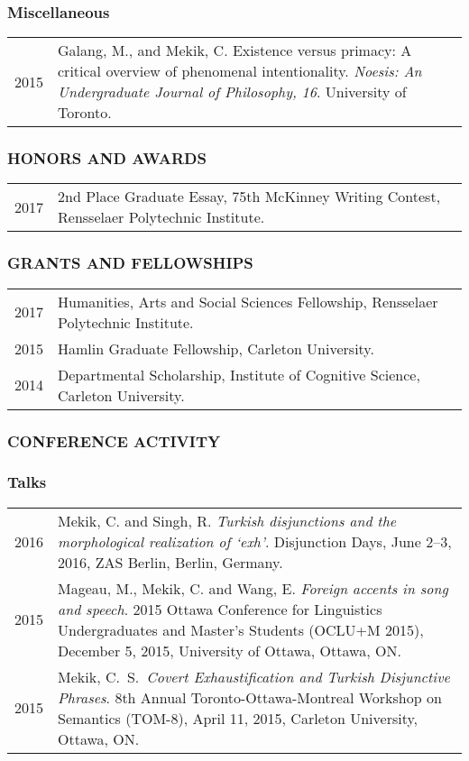 \documentclass[12pt, letterpaper]{article}
\begin{document}
\subsubsection*{Miscellaneous}
\begin{longtable}{p{}p{}}
2015&\noindent\hangindent=1cm Galang, M., and Mekik, C. Existence versus primacy: A critical overview of phenomenal intentionality. \emph{Noesis: An Undergraduate Journal of Philosophy, 16}. University of Toronto.
\end{longtable}

\subsubsection*{HONORS AND AWARDS}
\begin{longtable}{p{}p{}}
2017 & 2nd Place Graduate Essay, 75th McKinney Writing Contest, Rensselaer Polytechnic Institute. \\
\end{longtable}

\subsubsection*{GRANTS AND FELLOWSHIPS}
\begin{longtable}{p{}p{}}
2017 & Humanities, Arts and Social Sciences Fellowship, Rensselaer Polytechnic Institute. \\
2015 & Hamlin Graduate Fellowship, Carleton University. \\
2014 & Departmental Scholarship, Institute of Cognitive Science, Carleton University.
\end{longtable}

\subsubsection*{CONFERENCE ACTIVITY}

\subsubsection*{Talks}

\begin{longtable}{p{}p{}}
2016 & \noindent\hangindent=1cm Mekik, C. and Singh, R. \emph{Turkish disjunctions and the morphological realization of `exh'}. Disjunction Days, June 2--3, 2016, ZAS Berlin, Berlin, Germany.\\

2015 & \noindent\hangindent=1cm Mageau, M., Mekik, C. and Wang, E. \emph{Foreign accents in song and speech}. 2015 Ottawa Conference for Linguistics Undergraduates and Master's Students (OCLU+M 2015), December 5, 2015, University of Ottawa, Ottawa, ON. \\

2015 & \noindent\hangindent=1cm Mekik, C.\ S.\ \emph{Covert Exhaustification and Turkish Disjunctive Phrases}. 8th Annual Toronto-Ottawa-Montreal Workshop on Semantics (TOM-8), April 11, 2015, Carleton University, Ottawa, ON.
\end{longtable}
\end{document}
